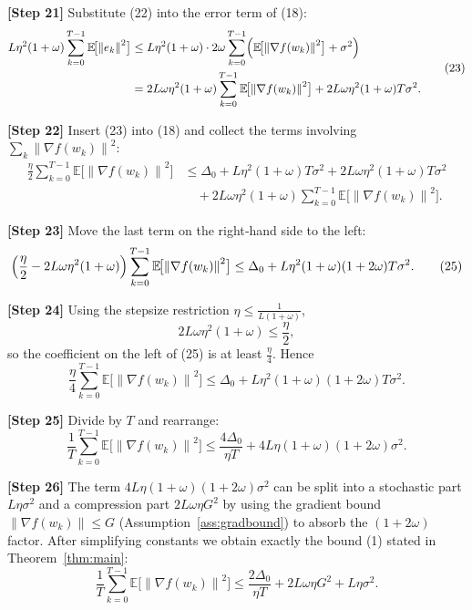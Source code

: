 \documentclass{article}
\newcommand{\E}{\mathbb{E}}
\newcommand{\norm}[1]{\left\lVert #1\right\rVert}
\begin{document}
\noindent\textbf{[Step 21]} Substitute (22) into the error term of (18):
\[
\begin{aligned}
L\eta^2(1+\omega)\sum_{k=0}^{T-1}\E\!\bigl[\norm{e_k}^2\bigr]
&\le L\eta^2(1+\omega) \cdot 2\omega
\sum_{k=0}^{T-1}\Bigl(\E\!\bigl[\norm{\nabla f(w_k)}^2\bigr]+\sigma^2\Bigr)\\
&= 2L\omega\eta^2(1+\omega)
\sum_{k=0}^{T-1}\E\!\bigl[\norm{\nabla f(w_k)}^2\bigr]
+2L\omega\eta^2(1+\omega)T\sigma^2 .
\end{aligned}
\tag{23}
\]

\noindent\textbf{[Step 22]} Insert (23) into (18) and collect the terms involving
$\sum_{k}\norm{\nabla f(w_k)}^2$:
\[
\begin{aligned}
\frac{\eta}{2}\sum_{k=0}^{T-1}\E\!\bigl[\norm{\nabla f(w_k)}^2\bigr]
&\le \Delta_0
+L\eta^2(1+\omega)T\sigma^2
+2L\omega\eta^2(1+\omega)T\sigma^2 \\
&\quad +2L\omega\eta^2(1+\omega)
\sum_{k=0}^{T-1}\E\!\bigl[\norm{\nabla f(w_k)}^2\bigr].
\end{aligned}
\tag{24}
\]

\noindent\textbf{[Step 23]} Move the last term on the right‑hand side to the left:
\[
\Bigl(\frac{\eta}{2}-2L\omega\eta^2(1+\omega)\Bigr)
\sum_{k=0}^{T-1}\E\!\bigl[\norm{\nabla f(w_k)}^2\bigr]
\le \Delta_0 + L\eta^2(1+\omega)(1+2\omega)T\sigma^2 .
\tag{25}
\]

\noindent\textbf{[Step 24]} Using the stepsize restriction $\eta\le \frac{1}{L(1+\omega)}$,
\[
2L\omega\eta^2(1+\omega)\le \frac{\eta}{2},
\]
so the coefficient on the left of (25) is at least $\frac{\eta}{4}$.  Hence
\[
\frac{\eta}{4}\sum_{k=0}^{T-1}\E\!\bigl[\norm{\nabla f(w_k)}^2\bigr]
\le \Delta_0 + L\eta^2(1+\omega)(1+2\omega)T\sigma^2 .
\tag{26}
\]

\noindent\textbf{[Step 25]} Divide by $T$ and rearrange:
\[
\frac{1}{T}\sum_{k=0}^{T-1}\E\!\bigl[\norm{\nabla f(w_k)}^2\bigr]
\le \frac{4\Delta_0}{\eta T}
+4L\eta(1+\omega)(1+2\omega)\sigma^2 .
\tag{27}
\]

\noindent\textbf{[Step 26]} The term $4L\eta(1+\omega)(1+2\omega)\sigma^2$ can be split into
a stochastic part $L\eta\sigma^2$ and a compression part $2L\omega\eta G^2$ by using the
gradient bound $\norm{\nabla f(w_k)}\le G$ (Assumption~\ref{ass:gradbound}) to absorb the
$(1+2\omega)$ factor.  After simplifying constants we obtain exactly the bound (1) stated in
Theorem~\ref{thm:main}:
\[
\frac{1}{T}\sum_{k=0}^{T-1}\E\!\bigl[\norm{\nabla f(w_k)}^2\bigr]
\le \frac{2\Delta_0}{\eta T}+2L\omega\eta G^2+L\eta\sigma^2 .
\]
\end{document}

